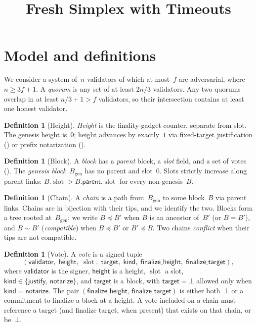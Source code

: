 \documentclass{article}
\title{Fresh Simplex with Timeouts}
\newcommand{\genesis}{\ensuremath{B_{\mathrm{gen}}}}
\newcommand{\slot}[0]{\ensuremath{\operatorname{\mathrm{slot}}}}
\newcommand{\target}{\mathsf{target}}
\newcommand{\kind}{\mathsf{kind}}
\newcommand{\height}{\mathsf{height}}
\newcommand{\validator}{\mathsf{validator}}
\newcommand{\just}{\ensuremath{\mathsf{justify}}\xspace}
\newcommand{\notar}{\ensuremath{\mathsf{notarize}}\xspace}
\newcommand{\parent}{\mathsf{parent}}
\newcommand{\finalizeHeight}{\mathsf{finalize\_height}}
\newcommand{\finalizeTarget}{\mathsf{finalize\_target}}
\theoremstyle{plain}
\theoremstyle{definition}
\newtheorem{definition}[theorem]{Definition}
\theoremstyle{remark}
\begin{document}
\maketitle

\section{Model and definitions}

We consider a system of~$n$ validators of which at most~$f$ are adversarial, where $n \geq 3f + 1$.
A \emph{quorum} is any set of at least $2n/3$ validators.
Any two quorums overlap in at least $n/3 + 1 > f$ validators, so their intersection contains at least one honest validator.

\begin{definition}[Height]\label{def:height}
\emph{Height} is the finality-gadget counter, separate from slot.
The genesis height is~$0$; height advances by exactly~$1$ via fixed-target justification () or prefix notarization ().
\end{definition}

\begin{definition}[Block]\label{def:block}
A \emph{block} has a \emph{parent} block, a \emph{slot} field, and a set of votes ().
The \emph{genesis block}~$\genesis$ has no parent and slot~$0$.
Slots strictly increase along parent links: $B.\slot > B.\parent.\slot$ for every non-genesis~$B$.
\end{definition}

\begin{definition}[Chain]\label{def:chain}
A \emph{chain} is a path from~$\genesis$ to some block~$B$ via parent links.
Chains are in bijection with their tips, and we identify the two.
Blocks form a tree rooted at~$\genesis$; we write $B \preceq B'$ when $B$ is an ancestor of~$B'$ (or $B = B'$), and $B \sim B'$ (\emph{compatible}) when $B \preceq B'$ or $B' \preceq B$.
Two chains \emph{conflict} when their tips are not compatible.
\end{definition}

\begin{definition}[Vote]\label{def:vote}
A \emph{vote} is a signed tuple
\[
  (\validator,\; \height,\; \slot,\; \target,\; \kind,\; \finalizeHeight,\; \finalizeTarget),
\]
where $\validator$ is the signer, $\height$ is a height, $\slot$ a slot, $\kind \in \{\just,\, \notar\}$, and $\target$ is a block, with $\target = \bot$ allowed only when $\kind = \notar$.
The pair $(\finalizeHeight,\, \finalizeTarget)$ is either both~$\bot$ or a commitment to finalize a block at a height.
A vote included on a chain must reference a target (and finalize target, when present) that exists on that chain, or be~$\bot$.
\end{definition}
\end{document}
